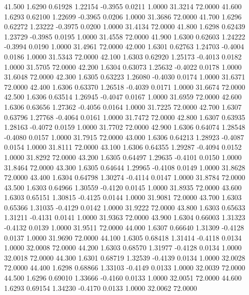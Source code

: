   41.500   1.6290   0.61928   1.22154  -0.3955   0.0211   1.0000  31.3214  72.0000
  41.600   1.6293   0.62100   1.22699  -0.3965   0.0206   1.0000  31.3686  72.0000
  41.700   1.6296   0.62272   1.23222  -0.3975   0.0200   1.0000  31.4134  72.0000
  41.800   1.6298   0.62439   1.23729  -0.3985   0.0195   1.0000  31.4558  72.0000
  41.900   1.6300   0.62603   1.24222  -0.3994   0.0190   1.0000  31.4961  72.0000
  42.000   1.6301   0.62763   1.24703  -0.4004   0.0186   1.0000  31.5343  72.0000
  42.100   1.6303   0.62920   1.25173  -0.4013   0.0182   1.0000  31.5705  72.0000
  42.200   1.6304   0.63073   1.25632  -0.4022   0.0178   1.0000  31.6048  72.0000
  42.300   1.6305   0.63223   1.26080  -0.4030   0.0174   1.0000  31.6371  72.0000
  42.400   1.6306   0.63370   1.26518  -0.4039   0.0171   1.0000  31.6674  72.0000
  42.500   1.6306   0.63514   1.26945  -0.4047   0.0167   1.0000  31.6959  72.0000
  42.600   1.6306   0.63656   1.27362  -0.4056   0.0164   1.0000  31.7225  72.0000
  42.700   1.6307   0.63796   1.27768  -0.4064   0.0161   1.0000  31.7472  72.0000
  42.800   1.6307   0.63935   1.28163  -0.4072   0.0159   1.0000  31.7702  72.0000
  42.900   1.6306   0.64074   1.28548  -0.4080   0.0157   1.0000  31.7915  72.0000
  43.000   1.6306   0.64213   1.28923  -0.4087   0.0154   1.0000  31.8111  72.0000
  43.100   1.6306   0.64355   1.29287  -0.4094   0.0152   1.0000  31.8292  72.0000
  43.200   1.6305   0.64497   1.29635  -0.4101   0.0150   1.0000  31.8464  72.0000
  43.300   1.6305   0.64644   1.29965  -0.4108   0.0149   1.0000  31.8628  72.0000
  43.400   1.6304   0.64798   1.30274  -0.4114   0.0147   1.0000  31.8784  72.0000
  43.500   1.6303   0.64966   1.30559  -0.4120   0.0145   1.0000  31.8935  72.0000
  43.600   1.6303   0.65151   1.30815  -0.4125   0.0144   1.0000  31.9081  72.0000
  43.700   1.6303   0.65366   1.31035  -0.4129   0.0142   1.0000  31.9222  72.0000
  43.800   1.6303   0.65633   1.31211  -0.4131   0.0141   1.0000  31.9363  72.0000
  43.900   1.6304   0.66003   1.31323  -0.4132   0.0139   1.0000  31.9511  72.0000
  44.000   1.6307   0.66640   1.31309  -0.4128   0.0137   1.0000  31.9690  72.0000
  44.100   1.6305   0.68418   1.31414  -0.4118   0.0134   1.0000  32.0008  72.0000
  44.200   1.6303   0.68570   1.31977  -0.4128   0.0134   1.0000  32.0018  72.0000
  44.300   1.6301   0.68719   1.32539  -0.4139   0.0134   1.0000  32.0028  72.0000
  44.400   1.6298   0.68866   1.33103  -0.4149   0.0133   1.0000  32.0039  72.0000
  44.500   1.6296   0.69010   1.33666  -0.4160   0.0133   1.0000  32.0051  72.0000
  44.600   1.6293   0.69154   1.34230  -0.4170   0.0133   1.0000  32.0062  72.0000
